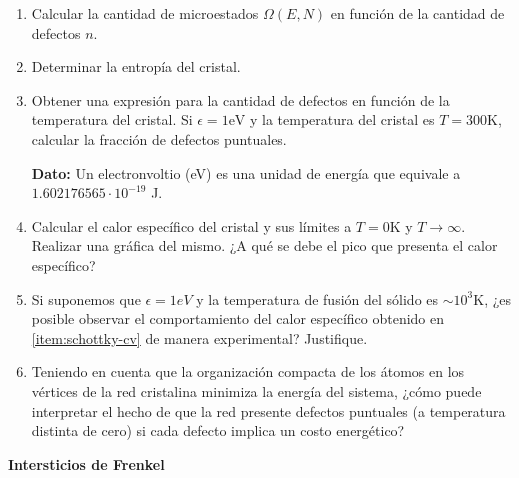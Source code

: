 \documentclass[a4paper,11pt]{article}
\begin{document}
\begin{enumerate}[label=(\alph*),
                  leftmargin=2\parindent,
                  rightmargin=2\parindent]

    \item{\label{item:schottky-microestados}
          Calcular la cantidad de microestados $\Omega(E, N)$ en 
          función de la cantidad de defectos $n$.
          }

    \item{\label{item:schottky-entropia}
          Determinar la entropía del cristal.}
    
    \item{\label{item:schottky-defectos}
          Obtener una expresión para la cantidad de defectos en 
          función de la temperatura del cristal.
          Si $\epsilon = 1 \text{eV}$ y la temperatura del cristal es
          $T = 300 \text{K}$, calcular la fracción de defectos 
          puntuales.
          }

    {\small
    \textbf{Dato:}
    Un electronvoltio (eV) es una unidad de energía que equivale a 
    $1.602176565 \cdot 10^{-19}$ J.
    }
    
    \item{\label{item:schottky-cv}
          Calcular el calor específico del cristal y sus límites
          a $T = 0 \text{K}$ y $T \rightarrow \infty$.
          Realizar una gráfica del mismo.
          ¿A qué se debe el pico que presenta el calor específico?
          }

    \item{Si suponemos que $\epsilon = 1eV$ y la temperatura de fusión 
          del sólido es $\sim 10^3 \text{K}$, ¿es posible observar 
          el comportamiento del calor específico obtenido en 
          \ref{item:schottky-cv} de manera experimental? Justifique.
          }
    
    \item{Teniendo en cuenta que la organización compacta de los átomos 
          en los vértices de la red cristalina minimiza la energía del 
          sistema, ¿cómo puede interpretar el hecho de que la red 
          presente defectos puntuales (a temperatura distinta de cero) si 
          cada defecto implica un costo energético?
          }

\end{enumerate}


\vspace{1em}
\textbf{Intersticios de Frenkel}
\vspace{0.5em}
\end{document}
